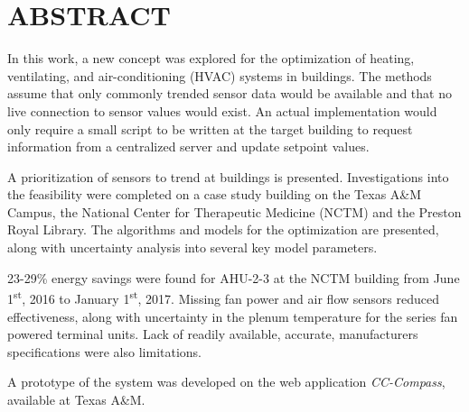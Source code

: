 %
%
%

\chapter*{\texorpdfstring{\MakeUppercase{ABSTRACT}}{ABSTRACT}}

\pagestyle{plain} %
\setcounter{page}{2}

\indent  In this work, a new concept was explored for the optimization
of heating, ventilating, and air-conditioning (HVAC) systems in
buildings. The methods assume that only commonly trended sensor data
would be available and that no live connection to sensor values would
exist.  An actual implementation would only require a small script to be
written at the target building to request information from a centralized
server and update setpoint values. 

A prioritization of sensors to trend at buildings is presented.
Investigations into the feasibility were completed on a case study
building on the Texas A\&M Campus, the National Center for Therapeutic
Medicine (NCTM) and the Preston Royal Library. The algorithms and models
for the optimization are presented, along with uncertainty analysis into
several key model parameters. 

23-29\% energy savings were found for AHU-2-3 at the NCTM
building from June 1\textsuperscript{st}, 2016 to January
1\textsuperscript{st}, 2017.  Missing fan power and air flow sensors
reduced effectiveness, along with uncertainty in the plenum temperature
for the series fan powered terminal units. Lack of readily available,
accurate, manufacturers specifications were also limitations.  

A prototype of the system was developed on the web application
\textit{CC-Compass}, available at Texas A\&M. 

\pagebreak{}
